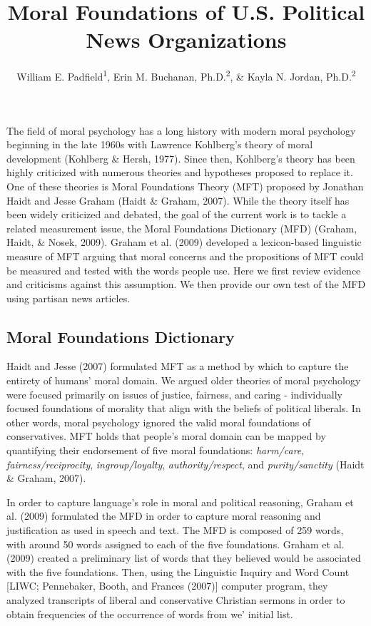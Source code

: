 \documentclass[
  english,
  man]{apa6}
\title{Moral Foundations of U.S. Political News Organizations}
\author{William E. Padfield\textsuperscript{1}, Erin M. Buchanan, Ph.D.\textsuperscript{2}, \& Kayla N. Jordan, Ph.D.\textsuperscript{2}}
\date{}
\affiliation{\vspace{0.5cm}\textsuperscript{1} Missouri State University\\\textsuperscript{2} Harrisburg University of Science and Technology}
\begin{document}
\maketitle

The field of moral psychology has a long history with modern moral psychology beginning in the late 1960s with Lawrence Kohlberg's theory of moral development (Kohlberg \& Hersh, 1977). Since then, Kohlberg's theory has been highly criticized with numerous theories and hypotheses proposed to replace it. One of these theories is Moral Foundations Theory (MFT) proposed by Jonathan Haidt and Jesse Graham (Haidt \& Graham, 2007). While the theory itself has been widely criticized and debated, the goal of the current work is to tackle a related measurement issue, the Moral Foundations Dictionary (MFD) (Graham, Haidt, \& Nosek, 2009). Graham et al. (2009) developed a lexicon-based linguistic measure of MFT arguing that moral concerns and the propositions of MFT could be measured and tested with the words people use. Here we first review evidence and criticisms against this assumption. We then provide our own test of the MFD using partisan news articles.

\hypertarget{moral-foundations-dictionary}{%
\subsection{Moral Foundations Dictionary}\label{moral-foundations-dictionary}}

Haidt and Jesse (2007) formulated MFT as a method by which to capture the entirety of humans' moral domain. We argued older theories of moral psychology were focused primarily on issues of justice, fairness, and caring - individually focused foundations of morality that align with the beliefs of political liberals. In other words, moral psychology ignored the valid moral foundations of conservatives. MFT holds that people's moral domain can be mapped by quantifying their endorsement of five moral foundations: \emph{harm/care}, \emph{fairness/reciprocity}, \emph{ingroup/loyalty}, \emph{authority/respect}, and \emph{purity/sanctity} (Haidt \& Graham, 2007).

In order to capture language's role in moral and political reasoning, Graham et al. (2009) formulated the MFD in order to capture moral reasoning and justification as used in speech and text. The MFD is composed of 259 words, with around 50 words assigned to each of the five foundations. Graham et al. (2009) created a preliminary list of words that they believed would be associated with the five foundations. Then, using the Linguistic Inquiry and Word Count {[}LIWC; Pennebaker, Booth, and Frances (2007){]} computer program, they analyzed transcripts of liberal and conservative Christian sermons in order to obtain frequencies of the occurrence of words from we' initial list.
\end{document}
